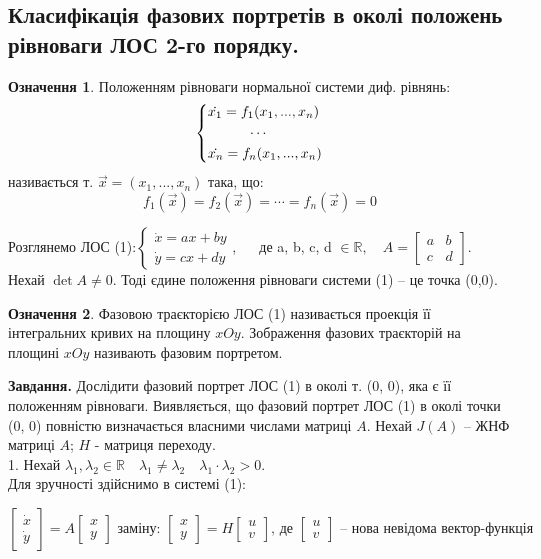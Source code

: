 \documentclass[14pt,a4paper]{scrartcl}
\theoremstyle{definition}
\newtheorem*{defo}{Означення}
\theoremstyle{definition}
\theoremstyle{definition}
\begin{document}
\subsection{Класифікація фазових портретів в околі положень рівноваги ЛОС 2-го порядку.}

\begin{defo}
    Положенням рівноваги нормальної системи диф. рівнянь:
    $$
    \begin{dcases}
        \dot{x_1} = f_1(x_1, ..., x_n)\\
        \qquad \quad \cdots\\
        \dot{x_n} = f_n(x_1, ..., x_n)
    \end{dcases}
    $$
    називається т. $\overrightarrow{x} = (x_1, ... , x_n)$ така, що:
    $$
    f_1 (\overrightarrow{x}) = f_2(\overrightarrow{x}) = \cdots = f_n(\overrightarrow{x}) =0
    $$
\end{defo}
Розглянемо ЛОС (1):$ \begin{cases}
    \dot{x} = ax + by\\
    \dot{y} = cx + dy
\end{cases}$, $\quad$ де a, b, c, d $\in \mathbb{R}, \quad A = \begin{bmatrix}
 a & b\\
 c & d
\end{bmatrix}$.\\


Нехай $\det A \neq 0$. Тоді єдине положення рівноваги системи (1) -- це точка (0,0).
\begin{defo}
    Фазовою траєкторією ЛОС (1) називається проекція її інтегральних кривих на площину $xOy$. Зображення фазових траєкторій на площині $xOy$ називають фазовим портретом.
\end{defo}
\textbf{Завдання.} Дослідити фазовий портрет ЛОС (1) в околі т. (0, 0), яка є її положенням рівноваги. Виявляється, що фазовий портрет ЛОС (1) в околі точки (0, 0) повністю визначається власними числами матриці $A$. Нехай $J(A)$ -- ЖНФ матриці $A$; $H$ - матриця переходу. \\

1. Нехай $\lambda_1 , \lambda_2 \in \mathbb{R} \quad \lambda_1 \neq \lambda_2 \quad \lambda_1 \cdot \lambda_2 > 0.$ \\ Для зручності здійснимо в системі (1):

$$
\begin{bmatrix}
 \dot{x}\\
 \dot{y}
\end{bmatrix} = A \begin{bmatrix}
 x \\
 y
\end{bmatrix} \text{ заміну: } \begin{bmatrix}
 x\\
 y
\end{bmatrix} = H \begin{bmatrix}
 u \\ v
\end{bmatrix} \text{, де }
 \begin{bmatrix}
 u \\
 v
\end{bmatrix} \text{ -- нова невідома вектор-функція}
$$
\end{document}
